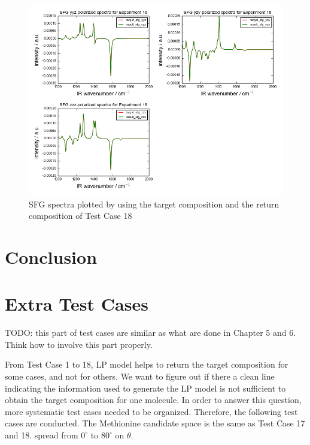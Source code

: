 \begin{figure}[!ht] 
\centering
\includegraphics[scale=0.7]{Figures/chapter4_result_target_plotting_500datapoint_sfg.png}
\caption{SFG spectra plotted by using the target composition and the return composition of Test Case 18} \label{fig:4.7}
\end{figure} 

\section{Conclusion}

\section{Extra Test Cases}
TODO: this part of test cases are similar as what are done in Chapter 5 and 6. Think how to involve this part properly.

From Test Case 1 to 18, LP model helps to return the target composition for some cases, and not for others. We want to figure out if there a clean line indicating the information used to generate the LP model is not sufficient to obtain the target composition for one molecule. In order to answer this question, more systematic test cases needed to be organized. Therefore, the following test cases are conducted. The Methionine candidate space is the same as Test Case 17 and 18. spread from $0^{\circ}$ to $80^{\circ}$ on $\theta$. 





